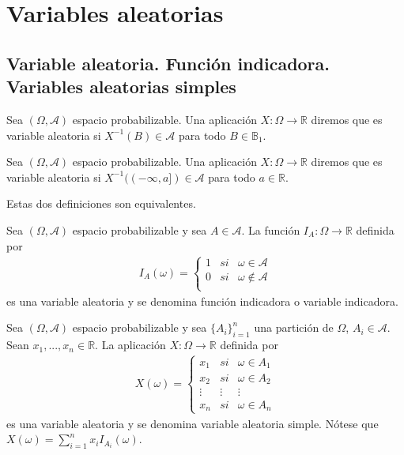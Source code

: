 \chapter{Variables aleatorias}

\section{Variable aleatoria. Función indicadora. Variables aleatorias simples}

\begin{defi}
Sea $(\Omega, \mathcal{A})$ espacio probabilizable. Una aplicación $X: \Omega \longrightarrow \mathbb{R}$ diremos que es variable aleatoria si $X^{-1}(B) \in \mathcal{A}$ para todo $B \in \mathbb{B}_1$.
\end{defi}

\begin{defi}
Sea $(\Omega, \mathcal{A})$ espacio probabilizable. Una aplicación $X: \Omega \longrightarrow \mathbb{R}$ diremos que es variable aleatoria si $X^{-1}((-\infty,a]) \in \mathcal{A}$ para todo $a \in \mathbb{R}$.
\end{defi}

\begin{obs}
Estas dos definiciones son equivalentes.
\end{obs}

\begin{defi}
Sea $(\Omega, \mathcal{A})$ espacio probabilizable y sea $A \in \mathcal{A}$. La función $I_A: \Omega \longrightarrow \mathbb{R}$ definida por
\begin{align*}
    I_A(\omega) = \left\{ \begin{array}{lcc}
             1 &  si  & \omega \in \mathcal{A}\\
             0 &  si  &\omega \not \in \mathcal{A}\\
             \end{array}
        \right.
\end{align*}
es una variable aleatoria y se denomina función indicadora o variable indicadora.
\end{defi}

\begin{defi}
Sea $(\Omega, \mathcal{A})$ espacio probabilizable y sea $\{A_i\}_{i=1}^{n}$ una partición de $\Omega$, $A_i \in \mathcal{A}$. Sean $x_1,...,x_n \in \mathbb{R}$. La aplicación $X: \Omega \longrightarrow \mathbb{R}$ definida por
\begin{align*}
    X(\omega) = \left\{ \begin{array}{lcc}
             x_1 &  si  & \omega \in A_1\\
             x_2 &  si  &\omega  \in A_2\\
             \vdots & \vdots & \vdots \\
             x_n & si & \omega  \in A_n
             \end{array}
        \right.
\end{align*}
es una variable aleatoria y se denomina variable aleatoria simple. Nótese que $X(\omega) = \sum_{i=1}^{n}{x_iI_{A_i}(\omega)}$.
\end{defi}

